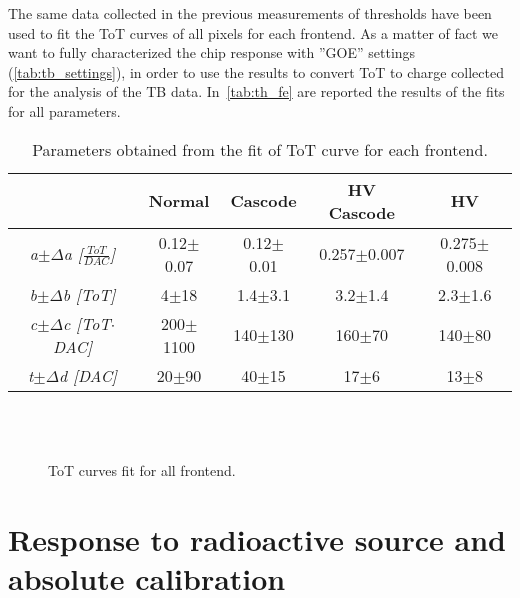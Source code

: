 The same data collected in the previous measurements of thresholds have been used to fit the ToT curves of all pixels for each frontend. As a matter of fact we want to fully characterized the chip response with ''GOE'' settings (\autoref{tab:tb_settings}), in order to use the results to convert ToT to charge collected for the analysis of the TB data.
In~\autoref{tab:th_fe} are reported the results of the fits for all parameters.

\begin{table}[h!]
\centering
\begin{tabular}{c|c|c|c|c}
 & \textbf{Normal} & \textbf{Cascode} & \textbf{HV Cascode} & \textbf{HV} \\
\hline
\hline
\textit{a$\pm\Delta$a [$\frac{ToT}{DAC}$]} & 0.12$\pm$0.07 & 0.12$\pm$0.01 & 0.257$\pm$0.007 & 0.275$\pm$0.008 \\
\hline
\textit{b$\pm\Delta$b [ToT]} & 4$\pm$18 & 1.4$\pm$3.1 & 3.2$\pm$1.4 & 2.3$\pm$1.6 \\
\hline
\textit{c$\pm\Delta$c [ToT$\cdot$DAC]} & 200$\pm$1100 & 140$\pm$130 & 160$\pm$70 & 140$\pm$80 \\
\hline
\textit{t$\pm\Delta$d [DAC]} & 20$\pm$90 & 40$\pm$15 & 17$\pm$6 & 13$\pm$8 \\
\hline
\hline
\end{tabular}
\caption{Parameters obtained from the fit of ToT curve for each frontend.}
\label{tab:th_fe}
\end{table}

\begin{figure}[h!]
\centering
{}\quad
{}\\
\quad
{}\\
\caption{ToT curves fit for all frontend.}
\label{fig:tot_fe}
\end{figure}


\section{Response to radioactive source and absolute calibration} \label{sec:source_ana}


